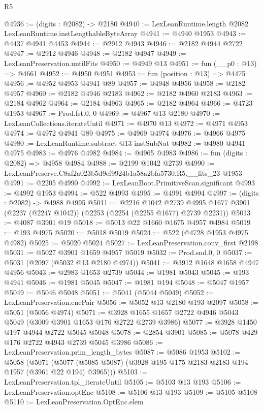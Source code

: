 \begin{lexlean}{R5}
\begin{coremodule}
@4936 := (digits : @2082) -> @2180
@4940 := LexLeanRuntime.length @2082 LexLeanRuntime.instLengthableByteArray
@4941 := @4940 @1953
@4943 := @4437 @4941 @4453
@4944 := @2912 @4943
@4946 := @2182 @4944 @2722
@4947 := @2912 @4946
@4948 := @2182 @4947
@4949 := LexLeanPreservation.untilFits
@4950 := @4949 @13
@4951 := fun (__p0 : @13) => @4661
@4952 := @4950 @4951
@4953 := fun (position : @13) => @4475
@4956 := @4952 @4953 @4941 @89
@4957 := @4948 @4956
@4958 := @2182 @4957
@4960 := @2182 @4946 @2183
@4962 := @2182 @4960 @2183
@4963 := @2184 @4962
@4964 := @2184 @4963
@4965 := @2182 @4964
@4966 := @4723 @1953
@4967 := Prod.fst.{0, 0}
@4969 := @4967 @13 @2180
@4970 := LexLeanCollections.iterateUntil
@4971 := @4970 @13
@4972 := @4971 @4953
@4974 := @4972 @4941 @89
@4975 := @4969 @4974
@4976 := @4966 @4975
@4980 := LexLeanRuntime.subtract @13 instSubNat
@4982 := @4980 @4941 @4975
@4983 := @4976 @4982
@4984 := @4965 @4983
@4986 := fun (digits : @2082) => @4958 @4984
@4988 := @2199 @1042 @2739
@4990 := LexLeanPreserve.C8af2a023b5d9ef9924b1a58a2bfa5730.R5.__fits_23 @1953
@4991 := @2205 @4990
@4992 := LexLeanBoot.PrimitiveScan.significant
@4993 := @4992 @1953
@4994 := @522 @4993
@4995 := @4991 @4994
@4997 := (digits : @2082) -> @4988 @4995
@5011 := @2216
    @1042
    @2739
    @4995
    @1677
    @3901
    (@2237 (@2247 @1042))
    (@2253 (@2254 (@2255 @1677) @2739 @2231))
@5013 := @4087 @3901 @19
@5018 := @5013 @22 @1660 @1675 @4957 @4984
@5019 := @193 @4975
@5020 := @5018 @5019
@5024 := @522 (@4728 @1953 @4975 @4982)
@5025 := @5020 @5024
@5027 := LexLeanPreservation.conv_first @2198
@5031 := @5027 @3901 @1659 @4957 @5019
@5032 := Prod.snd.{0, 0}
@5037 := @5031 (@2097 (@5032 @13 @2180 @4974))
@5041 := @3912 @1648 @1658 @4947 @4956
@5043 := @2983 @1653 @2739
@5044 := @1981 @5043
@5045 := @193 @4941
@5046 := @1981 @5045
@5047 := @1981 @194
@5048 := @5047 @1957
@5049 := @5046 @5048
@5051 := @5041 (@5044 @5049)
@5052 := LexLeanPreservation.encPair
@5056 := @5052 @13 @2180 @193 @2097
@5058 := @5051 (@5056 @4974)
@5071 := @3928 @1655 @1657 @2722 @4946 @5043 @5049 (@3009 @3901 @1653 @176 @2722 @2739 @3986)
@5077 := @3928 @1450 @197 @4944 @2722 @5045 @5048
@5078 := @2854 @3901
@5085 := @5078 @429 @176 @2722 @4943 @2739 @5045 @3986
@5086 := LexLeanPreservation.prim_length_bytes
@5087 := @5086 @1953
@5102 := @5058
    (@5071 (@5077 (@5085 @5087) (@3928 @195 @175 @2183 @2183 @194 @1957 (@3961 @22 @194) @3965)))
@5103 := LexLeanPreservation.tpl_iterateUntil
@5105 := @5103 @13 @193
@5106 := LexLeanPreservation.optEnc
@5108 := @5106 @13 @193
@5109 := @5105 @5108
@5110 := LexLeanPreservation.OptEnc.elem

\end{coremodule}
\end{lexlean}
